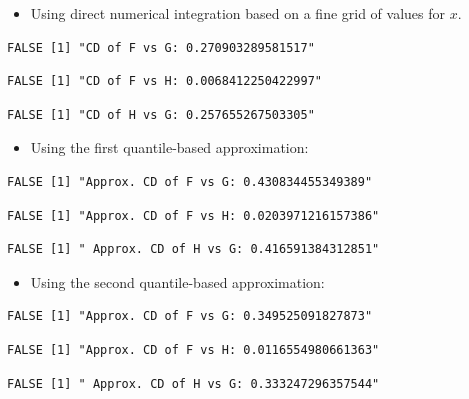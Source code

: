 \documentclass[
]{article}
\providecommand{\tightlist}{%
  \setlength{\itemsep}{0pt}\setlength{\parskip}{0pt}}
\begin{document}
\begin{itemize}
\tightlist
\item
  Using direct numerical integration based on a fine grid of values for
  \(x\).
\end{itemize}

\begin{verbatim}
FALSE [1] "CD of F vs G: 0.270903289581517"
\end{verbatim}

\begin{verbatim}
FALSE [1] "CD of F vs H: 0.0068412250422997"
\end{verbatim}

\begin{verbatim}
FALSE [1] "CD of H vs G: 0.257655267503305"
\end{verbatim}

\begin{itemize}
\tightlist
\item
  Using the first quantile-based approximation:
\end{itemize}

\begin{verbatim}
FALSE [1] "Approx. CD of F vs G: 0.430834455349389"
\end{verbatim}

\begin{verbatim}
FALSE [1] "Approx. CD of F vs H: 0.0203971216157386"
\end{verbatim}

\begin{verbatim}
FALSE [1] " Approx. CD of H vs G: 0.416591384312851"
\end{verbatim}

\begin{itemize}
\tightlist
\item
  Using the second quantile-based approximation:
\end{itemize}

\begin{verbatim}
FALSE [1] "Approx. CD of F vs G: 0.349525091827873"
\end{verbatim}

\begin{verbatim}
FALSE [1] "Approx. CD of F vs H: 0.0116554980661363"
\end{verbatim}

\begin{verbatim}
FALSE [1] " Approx. CD of H vs G: 0.333247296357544"
\end{verbatim}
\end{document}
